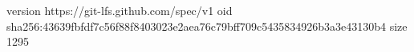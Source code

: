 version https://git-lfs.github.com/spec/v1
oid sha256:43639fbfdf7c56f88f8403023e2aea76c79bff709c5435834926b3a3e43130b4
size 1295
